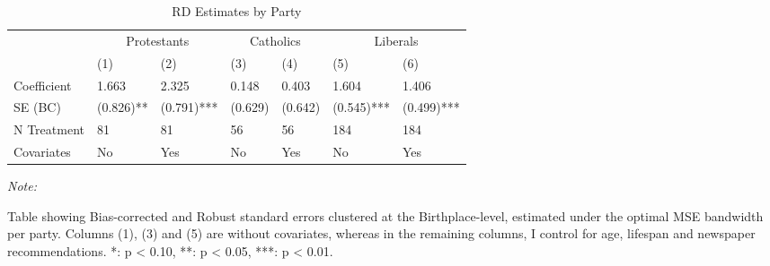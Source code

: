 \begin{table}[!h]

\caption{\label{tab:results_per_party}RD Estimates by Party}
\centering
\fontsize{10}{12}\selectfont
\begin{threeparttable}
\begin{tabular}[t]{lllllll}
\toprule
\multicolumn{1}{c}{ } & \multicolumn{2}{c}{Protestants} & \multicolumn{2}{c}{Catholics} & \multicolumn{2}{c}{Liberals} \\
\cmidrule(l{3pt}r{3pt}){2-3} \cmidrule(l{3pt}r{3pt}){4-5} \cmidrule(l{3pt}r{3pt}){6-7}
  & (1) & (2) & (3) & (4) & (5) & (6)\\
\midrule
Coefficient & 1.663 & 2.325 & 0.148 & 0.403 & 1.604 & 1.406\\
SE (BC) & (0.826)** & (0.791)*** & (0.629) & (0.642) & (0.545)*** & (0.499)***\\
N Treatment & 81 & 81 & 56 & 56 & 184 & 184\\
Covariates & No & Yes & No & Yes & No & Yes\\
\bottomrule
\end{tabular}
\begin{tablenotes}[para]
\item \textit{Note: } 
\item Table showing Bias-corrected and Robust standard errors clustered at the Birthplace-level, estimated under the optimal MSE bandwidth per party. Columns (1), (3) and (5) are without covariates, whereas in the remaining columns, I control for age, lifespan and newspaper recommendations. *: p < 0.10, **: p < 0.05, ***: p < 0.01.
\end{tablenotes}
\end{threeparttable}
\end{table}
